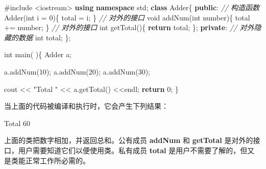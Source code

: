 \documentclass[
]{article}
\newenvironment{Shaded}{}{}
\newcommand{\CommentTok}[1]{\textcolor[rgb]{0.38,0.63,0.69}{\textit{#1}}}
\newcommand{\ControlFlowTok}[1]{\textcolor[rgb]{0.00,0.44,0.13}{\textbf{#1}}}
\newcommand{\DataTypeTok}[1]{\textcolor[rgb]{0.56,0.13,0.00}{#1}}
\newcommand{\DecValTok}[1]{\textcolor[rgb]{0.25,0.63,0.44}{#1}}
\newcommand{\ImportTok}[1]{#1}
\newcommand{\KeywordTok}[1]{\textcolor[rgb]{0.00,0.44,0.13}{\textbf{#1}}}
\newcommand{\NormalTok}[1]{#1}
\newcommand{\OperatorTok}[1]{\textcolor[rgb]{0.40,0.40,0.40}{#1}}
\newcommand{\PreprocessorTok}[1]{\textcolor[rgb]{0.74,0.48,0.00}{#1}}
\newcommand{\StringTok}[1]{\textcolor[rgb]{0.25,0.44,0.63}{#1}}
\begin{document}
\begin{Shaded}
\begin{Highlighting}[]
\PreprocessorTok{\#include }\ImportTok{\textless{}iostream\textgreater{}}
\KeywordTok{using} \KeywordTok{namespace}\NormalTok{ std}\OperatorTok{;}
\KeywordTok{class}\NormalTok{ Adder}\OperatorTok{\{}
   \KeywordTok{public}\OperatorTok{:}
      \CommentTok{// 构造函数}
\NormalTok{      Adder}\OperatorTok{(}\DataTypeTok{int}\NormalTok{ i }\OperatorTok{=} \DecValTok{0}\OperatorTok{)\{}
\NormalTok{        total }\OperatorTok{=}\NormalTok{ i}\OperatorTok{;}
      \OperatorTok{\}}
      \CommentTok{// 对外的接口}
      \DataTypeTok{void}\NormalTok{ addNum}\OperatorTok{(}\DataTypeTok{int}\NormalTok{ number}\OperatorTok{)\{}
\NormalTok{          total }\OperatorTok{+=}\NormalTok{ number}\OperatorTok{;}
      \OperatorTok{\}}
      \CommentTok{// 对外的接口}
      \DataTypeTok{int}\NormalTok{ getTotal}\OperatorTok{()\{}
          \ControlFlowTok{return}\NormalTok{ total}\OperatorTok{;}
      \OperatorTok{\};}
   \KeywordTok{private}\OperatorTok{:}
      \CommentTok{// 对外隐藏的数据}
      \DataTypeTok{int}\NormalTok{ total}\OperatorTok{;}
\OperatorTok{\};}
      
\DataTypeTok{int}\NormalTok{ main}\OperatorTok{(} \OperatorTok{)\{}
\NormalTok{   Adder a}\OperatorTok{;}
   
\NormalTok{   a}\OperatorTok{.}\NormalTok{addNum}\OperatorTok{(}\DecValTok{10}\OperatorTok{);}
\NormalTok{   a}\OperatorTok{.}\NormalTok{addNum}\OperatorTok{(}\DecValTok{20}\OperatorTok{);}
\NormalTok{   a}\OperatorTok{.}\NormalTok{addNum}\OperatorTok{(}\DecValTok{30}\OperatorTok{);}

\NormalTok{   cout }\OperatorTok{\textless{}\textless{}} \StringTok{"Total "} \OperatorTok{\textless{}\textless{}}\NormalTok{ a}\OperatorTok{.}\NormalTok{getTotal}\OperatorTok{()} \OperatorTok{\textless{}\textless{}}\NormalTok{endl}\OperatorTok{;}
   \ControlFlowTok{return} \DecValTok{0}\OperatorTok{;}
\OperatorTok{\}}
\end{Highlighting}
\end{Shaded}

当上面的代码被编译和执行时，它会产生下列结果：

\begin{Shaded}
\begin{Highlighting}[]
\NormalTok{Total }\DecValTok{60}
\end{Highlighting}
\end{Shaded}

上面的类把数字相加，并返回总和。公有成员 \textbf{addNum} 和
\textbf{getTotal} 是对外的接口，用户需要知道它们以便使用类。私有成员
\textbf{total} 是用户不需要了解的，但又是类能正常工作所必需的。
\end{document}
